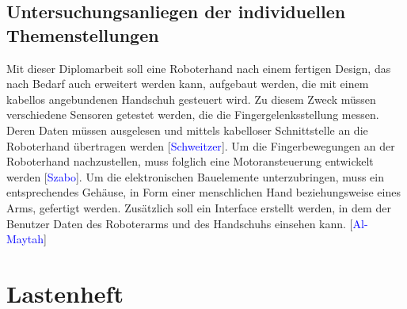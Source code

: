 \documentclass[titlepage,12pt,twoside]{article}
\begin{document}
\subsection{Untersuchungsanliegen der individuellen Themenstellungen}
\label{chap:Untersuchungsanliegen der individuellen Themenstellungen}
Mit dieser Diplomarbeit soll eine Roboterhand nach einem fertigen Design, das nach Bedarf auch erweitert werden kann, aufgebaut werden,
die mit einem kabellos angebundenen Handschuh gesteuert wird. Zu diesem Zweck müssen
verschiedene Sensoren getestet werden, die die Fingergelenksstellung messen. Deren Daten
müssen ausgelesen und mittels kabelloser Schnittstelle an die Roboterhand übertragen werden
[\textcolor{blue}{Schweitzer}]. Um die Fingerbewegungen an der Roboterhand nachzustellen, muss folglich eine
Motoransteuerung entwickelt werden [\textcolor{blue}{Szabo}]. Um die elektronischen Bauelemente
unterzubringen, muss ein entsprechendes Gehäuse, in Form einer menschlichen Hand
beziehungsweise eines Arms, gefertigt werden. Zusätzlich soll ein Interface erstellt werden, in
dem der Benutzer Daten des Roboterarms und des Handschuhs einsehen kann. [\textcolor{blue}{Al-Maytah}] \\

\hfill \break
\hfill \break
\hfill \break
\hfill \break
\hfill \break
\hfill \break
\hfill \break
\hfill \break

\newpage
\section{Lastenheft}
\label{chap:Lastenheft}
\end{document}
